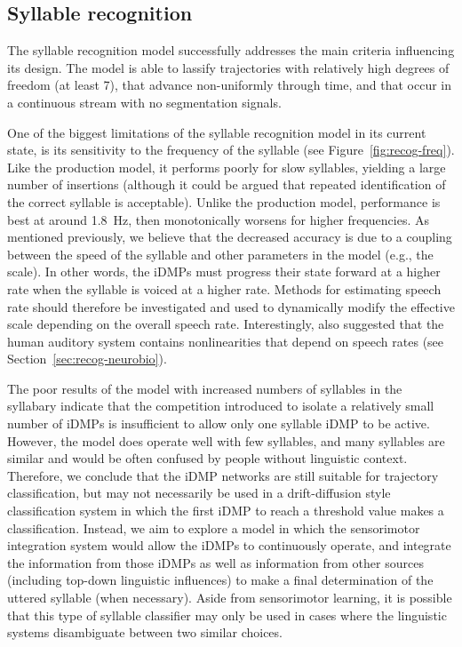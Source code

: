 \subsection{Syllable recognition}

The syllable recognition model
successfully addresses the main criteria
influencing its design.
The model is able to lassify trajectories
with relatively high degrees of freedom
(at least 7),
that advance non-uniformly through time,
and that occur in a continuous stream
with no segmentation signals.

One of the biggest limitations
of the syllable recognition model
in its current state,
is its sensitivity to the
frequency of the syllable
(see Figure~\ref{fig:recog-freq}).
Like the production model,
it performs poorly for
slow syllables,
yielding a large number of insertions
(although it could be argued that
repeated identification of the correct
syllable is acceptable).
Unlike the production model,
performance is best at around 1.8~Hz,
then monotonically worsens
for higher frequencies.
As mentioned previously,
we believe that the decreased accuracy
is due to a coupling between
the speed of the syllable
and other parameters in the model
(e.g., the scale).
In other words, the iDMPs
must progress their state forward
at a higher rate when
the syllable is voiced at a higher rate.
Methods for estimating speech rate
should therefore be investigated
and used to dynamically modify
the effective scale
depending on the overall speech rate.
Interestingly, \citet{pasley2012}
also suggested that the human auditory system
contains nonlinearities that depend
on speech rates
(see Section~\ref{sec:recog-neurobio}).

The poor results of the model
with increased numbers
of syllables in the syllabary
indicate that the competition
introduced to isolate a relatively small
number of iDMPs is insufficient
to allow only one syllable iDMP to be active.
However, the model does operate well
with few syllables,
and many syllables are similar
and would be often confused by people
without linguistic context.
Therefore, we conclude that
the iDMP networks are still suitable
for trajectory classification,
but may not necessarily be used in a
drift-diffusion style classification system
in which the first iDMP to reach
a threshold value makes a classification.
Instead, we aim to explore a model in which
the sensorimotor integration system
would allow the iDMPs to continuously operate,
and integrate the information from those iDMPs
as well as information from other sources
(including top-down linguistic influences)
to make a final determination
of the uttered syllable
(when necessary).
Aside from sensorimotor learning,
it is possible that
this type of syllable classifier
may only be used in cases where
the linguistic systems
disambiguate between two similar choices.

